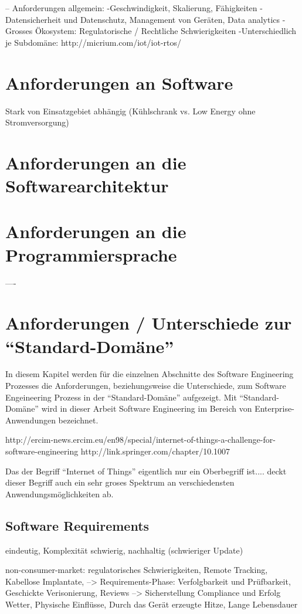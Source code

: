 --
Anforderungen allgemein:
-Geschwindigkeit, Skalierung, Fähigkeiten
-Datensicherheit und Datenschutz, Management von Geräten, Data analytics
-Grosses Ökosystem: Regulatorische / Rechtliche Schwierigkeiten
-Unterschiedlich je Subdomäne: http://micrium.com/iot/iot-rtos/
\section{Anforderungen an Software}
Stark von Einsatzgebiet abhängig (Kühlschrank vs. Low Energy ohne Stromversorgung)


\section{Anforderungen an die Softwarearchitektur}

\section{Anforderungen an die Programmiersprache}

----

\section{Anforderungen / Unterschiede zur "`Standard-Domäne"'}
In diesem Kapitel werden für die einzelnen Abschnitte des Software Engineering Prozesses die Anforderungen, beziehungsweise die Unterschiede, zum Software Engeineering Prozess in der "`Standard-Domäne"' aufgezeigt. Mit "`Standard-Domäne"' wird in dieser Arbeit Software Engineering im Bereich von Enterprise-Anwendungen bezeichnet.

http://ercim-news.ercim.eu/en98/special/internet-of-things-a-challenge-for-software-engineering
http://link.springer.com/chapter/10.1007%

Das der Begriff "`Internet of Things"' eigentlich nur ein Oberbegriff ist....
deckt dieser Begriff auch ein sehr groses Spektrum an verschiedensten Anwendungsmöglichkeiten ab.

\subsection{Software Requirements}
eindeutig, Komplexität schwierig, nachhaltig (schwieriger Update)

non-consumer-market: regulatorisches Schwierigkeiten, Remote Tracking, Kabellose Implantate, --> Requirements-Phase: Verfolgbarkeit und Prüfbarkeit, Geschickte Verisonierung, Reviews --> Sicherstellung Compliance und Erfolg
Wetter, Physische Einflüsse, Durch das Gerät erzeugte Hitze, Lange Lebensdauer

